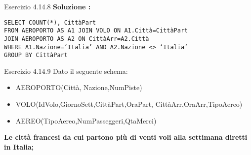 \begin{frame}{Esercizio 4.14.8}
    \textbf{Soluzione :}
    \vspace{1em}
    
    \texttt{SELECT COUNT(*), Citt\`aPart\\FROM AEROPORTO AS A1 JOIN VOLO ON A1.Citt\`a=Citt\`aPart
\\JOIN AEROPORTO AS A2 ON Citt\`aArr=A2.Citt\`a\\WHERE A1.Nazione=`Italia' AND A2.Nazione <> `Italia'\\GROUP BY Citt\`aPart}
\end{frame}
\begin{frame}{Esercizio 4.14.9}
    Dato il seguente schema:
    \begin{itemize}
        \item AEROPORTO(Citt\`a, Nazione,NumPiste)
        \item VOLO(IdVolo,GiornoSett,Citt\`aPart,OraPart,
        Citt\`aArr,OraArr,TipoAereo)
        \item AEREO(TipoAereo,NumPasseggeri,QtaMerci)
    \end{itemize}
    \vspace{1em}
    
    \textbf{Le citt\`a francesi da cui partono pi\`u di venti voli alla settimana diretti in Italia;}
\end{frame}

